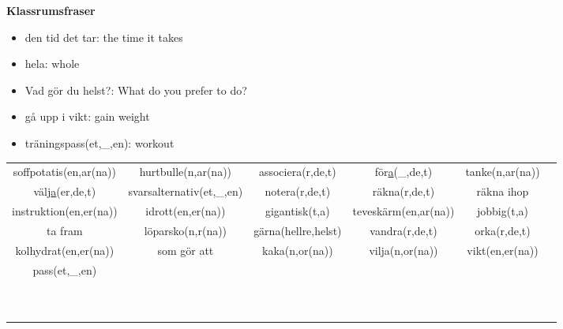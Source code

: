 
\begin{flushleft}
    \textbf{Klassrumsfraser}
    \begin{itemize}
        \item den tid det tar: the time it takes
        \item hela: whole
        \item Vad gör du helst?: What do you prefer to do?
        \item gå upp i vikt: gain weight
        \item träningspass(et,\_,en): workout
    \end{itemize}
\end{flushleft}

\begin{center}
    \begin{adjustwidth}{-2cm}{}
        \begin{tabular}{|c c c c c c|}
            \hline
            soffpotatis(en,ar(na)) & hurtbulle(n,ar(na)) & associera(r,de,t) & för\underline{a}(\_,de,t) & tanke(n,ar(na)) & \\
            välj\underline{a}(er,de,t) & svarsalternativ(et,\_,en) & notera(r,de,t) & räkna(r,de,t) & räkna ihop & \\
            instruktion(en,er(na)) & idrott(en,er(na)) & gigantisk(t,a) & teveskärm(en,ar(na)) & jobbig(t,a) & \\
            ta fram & löparsko(n,r(na)) & gärna(hellre,helst) & vandra(r,de,t) & orka(r,de,t) & \\
            kolhydrat(en,er(na)) & som gör att & kaka(n,or(na)) & vilja(n,or(na)) & vikt(en,er(na)) & \\
            pass(et,\_,en) &  &  &  &  & \\
             &  &  &  &  & \\
             &  &  &  &  & \\
             &  &  &  &  & \\
             &  &  &  &  & \\
             &  &  &  &  & \\
             &  &  &  &  & \\
             &  &  &  &  & \\
             &  &  &  &  & \\
             &  &  &  &  & \\
             &  &  &  &  & \\
            \hline
        \end{tabular}
    \end{adjustwidth}
\end{center}

